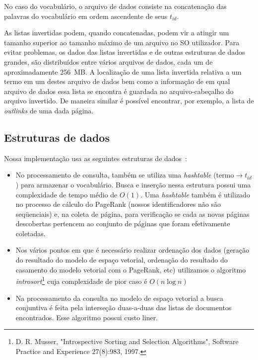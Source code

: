 \documentclass[10pt,twocolumn]{article}
\begin{document}
No caso do vocabulário, o arquivo de dados consiste na concatenação das
palavras do vocabulário em ordem ascendente de seus \(t_{id}\).

As listas invertidas podem, quando concatenadas, podem vir a atingir um tamanho
superior ao tamanho máximo de um arquivo no SO utilizador. Para evitar
problemas, os dados das listas invertidas e de outras estruturas de
dados grandes, são distribuídos entre vários
arquivos de dados, cada um de aproximadamente 256~MB. A localização de
uma lista invertida relativa a um termo em um destes arquivo de dados
bem como a informação de em qual arquivo de dados essa lista se encontra
é guardada no arquivo-cabeçalho do arquivo invertido. De maneira similar
é possível encontrar, por exemplo, a lista de \emph{outlinks} de uma
dada página.

\subsection{Estruturas de dados}\label{sec:datastructures}

Nossa implementação usa as seguintes estruturas de
dados~\cite{cormen-algorithms}:

\begin{itemize}

\item No processamento de consulta, também se utiliza uma
\emph{hashtable} (termo\(\rightarrow t_{id}\)) para armazenar o
vocabulário.  Busca e inserção nessa estrutura possui uma complexidade
de tempo médio de \(O\left(1 \right)\). Uma \emph{hashtable} também é
utilizado no processo de cálculo do PageRank (nossos identificadores não
são seqüenciais) e, na coleta de página, para verificação se cada as
novas páginas descobertas pertencem ao conjunto de páginas que foram
efetivamente coletadas.

\item Nos vários pontos em que é necessário realizar ordenação dos dados
(geração do resultado do modelo de espaço vetorial, ordenação do
resultado do casamento do modelo vetorial com o PageRank, etc) utilizamos
o algoritmo \emph{introsort}\footnote{ D. R. Musser,
"Introspective Sorting and Selection Algorithms", Software Practice and
Experience 27(8):983, 1997.  } cuja complexidade de pior caso é
\(O\left(n \log n\right)\)

\item Na processamento da consulta no modelo de espaço vetorial a busca
conjuntiva é feita pela interseção duas-a-duas das listas de documentos
encontrados. Esse algoritmo possui custo liner.

\end{itemize}
\end{document}
